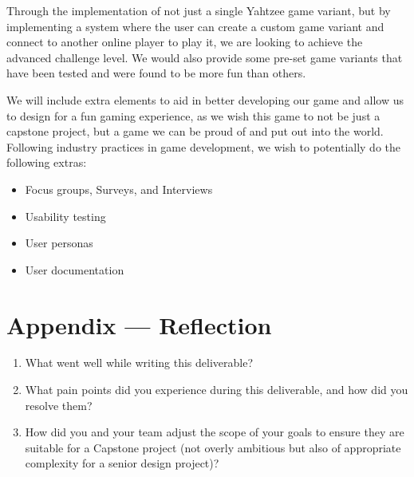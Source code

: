 \documentclass{article}
\begin{document}
\fi

Through the implementation of not just a single Yahtzee game variant, but by implementing a system where the user can create a custom game variant and connect to another online player to play it, we are looking to achieve the advanced challenge level. We would also provide some pre-set game variants that have been tested and were found to be more fun than others.

We will include extra elements to aid in better developing our game and allow us to design for a fun gaming experience, as we wish this game to not be just a capstone project, but a game we can be proud of and put out into the world. Following industry practices in game development, we wish to potentially do the following extras:

\begin{itemize}
	\item Focus groups, Surveys, and Interviews
	\item Usability testing
	\item User personas
	\item User documentation
\end{itemize}

\newpage{}

\section*{Appendix --- Reflection}




\begin{enumerate}
    \item What went well while writing this deliverable? 
    \item What pain points did you experience during this deliverable, and how
    did you resolve them?
    \item How did you and your team adjust the scope of your goals to ensure
    they are suitable for a Capstone project (not overly ambitious but also of
    appropriate complexity for a senior design project)?
\end{enumerate}  
\end{document}

